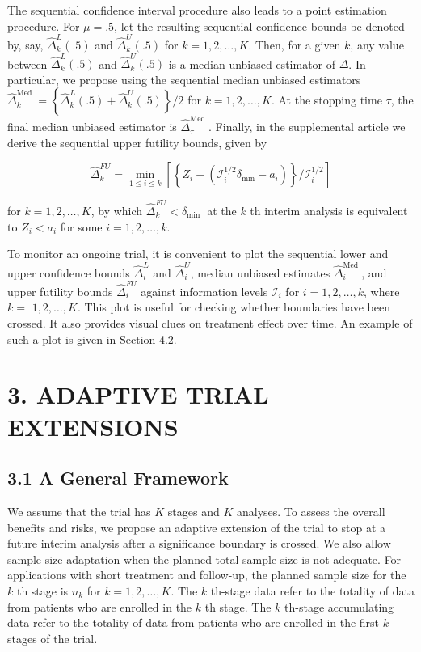 \documentclass[10pt]{article}
\begin{document}
The sequential confidence interval procedure also leads to a point estimation procedure. For $\mu=.5$, let the resulting sequential confidence bounds be denoted by, say, $\hat{\Delta}_{k}^{L}(.5)$ and $\hat{\Delta}_{k}^{U}(.5)$ for $k=1,2, \ldots, K$. Then, for a given $k$, any value between $\hat{\Delta}_{k}^{L}(.5)$ and $\hat{\Delta}_{k}^{U}(.5)$ is a median unbiased estimator of $\Delta$. In particular, we propose using the sequential median unbiased estimators $\hat{\Delta}_{k}^{\text {Med }}=\left\{\hat{\Delta}_{k}^{L}(.5)+\hat{\Delta}_{k}^{U}(.5)\right\} / 2$ for $k=1,2, \ldots, K$. At the stopping time $\tau$, the final median unbiased estimator is $\hat{\Delta}_{\tau}^{\text {Med }}$. Finally, in the supplemental article we derive the sequential upper futility bounds, given by


\begin{equation*}
\hat{\Delta}_{k}^{F U}=\min _{1 \leq i \leq k}\left[\left\{Z_{i}+\left(\mathcal{I}_{i}^{1 / 2} \delta_{\min }-a_{i}\right)\right\} / \mathcal{I}_{i}^{1 / 2}\right] \tag{9}
\end{equation*}


for $k=1,2, \ldots, K$, by which $\hat{\Delta}_{k}^{F U}<\delta_{\text {min }}$ at the $k$ th interim analysis is equivalent to $Z_{i}<a_{i}$ for some $i=1,2, \ldots, k$.

To monitor an ongoing trial, it is convenient to plot the sequential lower and upper confidence bounds $\hat{\Delta}_{i}^{L}$ and $\hat{\Delta}_{i}^{U}$, median unbiased estimates $\hat{\Delta}_{i}^{\text {Med }}$, and upper futility bounds $\hat{\Delta}_{i}^{F U}$ against information levels $\mathcal{I}_{i}$ for $i=1,2, \ldots, k$, where $k=$ $1,2, \ldots, K$. This plot is useful for checking whether boundaries have been crossed. It also provides visual clues on treatment effect over time. An example of such a plot is given in Section 4.2.

\section*{3. ADAPTIVE TRIAL EXTENSIONS}
\subsection*{3.1 A General Framework}
We assume that the trial has $K$ stages and $K$ analyses. To assess the overall benefits and risks, we propose an adaptive extension of the trial to stop at a future interim analysis after a significance boundary is crossed. We also allow sample size adaptation when the planned total sample size is not adequate. For applications with short treatment and follow-up, the planned sample size for the $k$ th stage is $n_{k}$ for $k=1,2, \ldots, K$. The $k$ th-stage data refer to the totality of data from patients who are enrolled in the $k$ th stage. The $k$ th-stage accumulating data refer to the totality of data from patients who are enrolled in the first $k$ stages of the trial.
\end{document}
